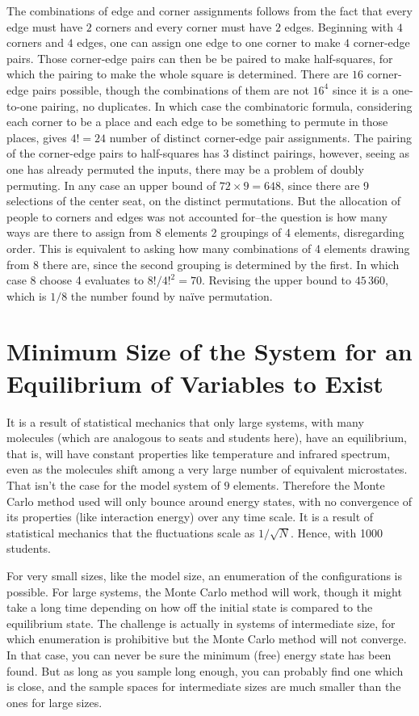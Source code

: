 \documentclass{article}
\begin{document}
The combinations of edge and corner assignments follows from the fact that every edge must have $2$ corners and every corner must have $2$ edges. Beginning with $4$ corners and $4$ edges, one can assign one edge to one corner to make $4$ corner-edge pairs. Those corner-edge pairs can then be be paired to make half-squares, for which the pairing to make the whole square is determined. There are $16$ corner-edge pairs possible, though the combinations of them are not $16^4$ since it is a one-to-one pairing, no duplicates. In which case the combinatoric formula, considering each corner to be a place and each edge to be something to permute in those places, gives $4! = 24$ number of distinct corner-edge pair assignments. The pairing of the corner-edge pairs to half-squares has $3$ distinct pairings, however, seeing as one has already permuted the inputs, there may be a problem of doubly permuting. In any case an upper bound of $72 \times 9 = 648$, since there are 9 selections of the center seat, on the distinct permutations. But the allocation of people to corners and edges was not accounted for--the question is how many ways are there to assign from 8 elements 2 groupings of 4 elements, disregarding order. This is equivalent to asking how many combinations of 4 elements drawing from 8 there are, since the second grouping is determined by the first. In which case 8 choose 4 evaluates to $8!/4!^2 = 70$. Revising the upper bound to $45\, 360$, which is $1/8$ the number found by na\"ive permutation.

\section{Minimum Size of the System for an Equilibrium of Variables to Exist}

It is a result of statistical mechanics that only large systems, with many molecules (which are analogous to seats and students here), have an equilibrium, that is, will have constant properties like temperature and infrared spectrum, even as the molecules shift among a very large number of equivalent microstates. That isn't the case for the model system of $9$ elements. Therefore the Monte Carlo method used will only bounce around energy states, with no convergence of its properties (like interaction energy) over any time scale. It is a result of statistical mechanics that the fluctuations scale as $1/\sqrt{N}$. Hence, with 1000 students.

For very small sizes, like the model size, an enumeration of the configurations is possible. For large systems, the Monte Carlo method will work, though it might take a long time depending on how off the initial state is compared to the equilibrium state. The challenge is actually in systems of intermediate size, for which enumeration is prohibitive but the Monte Carlo method will not converge. In that case, you can never be sure the minimum (free) energy state has been found. But as long as you sample long enough, you can probably find one which is close, and the sample spaces for intermediate sizes are much smaller than the ones for large sizes.
\end{document}
